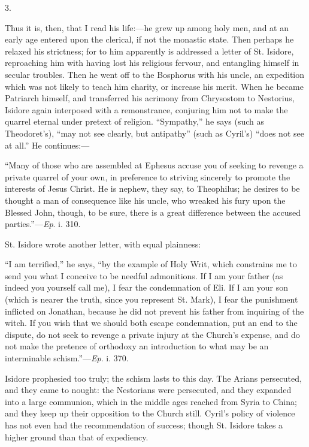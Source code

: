 3.

Thus it is, then, that I read his life:—he grew up among holy
men, and at an early age entered upon the clerical, if not the
monastic state. Then perhaps he relaxed his strictness; for to him
apparently is addressed a letter of St. Isidore, reproaching him with
having lost his religious fervour, and entangling himself in secular
troubles. Then he went off to the Bosphorus with his uncle, an
expedition which was not likely to teach him charity, or increase his
merit. When he became Patriarch himself, and transferred his acrimony
from Chrysostom to Nestorius, Isidore again interposed with a
remonstrance, conjuring him not to make the quarrel eternal under
pretext of religion. ``Sympathy,'' he says (such as Theodoret's),
``may not see clearly, but antipathy'' (such as Cyril's)
``does not see at all.'' He continues:—

``Many of those who are assembled at Ephesus accuse you of
seeking to revenge a private quarrel of your own, in preference to
striving sincerely to promote the interests of Jesus Christ. He is
nephew, they say, to Theophilus; he desires to be thought a man of
consequence like his uncle, who wreaked his fury upon the Blessed
John, though, to be sure, there is a great difference between the
accused parties.''—\emph{Ep}. i. 310.

St. Isidore wrote another letter, with equal plainness:

``I am terrified,'' he says, ``by the example of Holy
Writ, which constrains me to send you what I conceive to be needful
admonitions. If I am your father (as indeed you yourself call me), I
fear the condemnation of Eli. If I am your son (which is nearer the
truth, since you represent St. Mark), I fear the punishment inflicted
on Jonathan, because he did not prevent his father from inquiring of
the witch. If you wish that we should both escape condemnation, put an
end to the dispute, do not seek to revenge a private injury at the
Church's expense, and do not make the pretence of orthodoxy an
introduction to what may be an interminable schism.''—\emph{Ep}.
i. 370.

Isidore prophesied too truly; the schism lasts to this day. The
Arians persecuted, and they came to nought: the Nestorians were
persecuted, and they expanded into a large communion, which in the
middle ages reached from Syria to China; and they keep up their
opposition to the Church still. Cyril's policy of violence has not
even had the recommendation of success; though St. Isidore takes a
higher ground than that of expediency.


